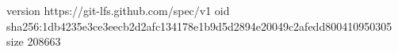 version https://git-lfs.github.com/spec/v1
oid sha256:1db4235e3ce3eecb2d2afc134178e1b9d5d2894e20049c2afedd800410950305
size 208663
